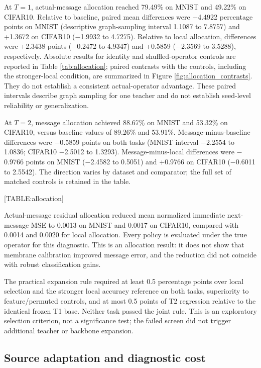 \documentclass{article}
\begin{document}
At $T=1$, actual-message allocation reached 79.49\% on MNIST and 49.22\% on CIFAR10. Relative to baseline, paired mean differences were +4.4922 percentage points on MNIST (descriptive graph-sampling interval 1.1087 to 7.8757) and +1.3672 on CIFAR10 ($-$1.9932 to 4.7275). Relative to local allocation, differences were +2.3438 points ($-$0.2472 to 4.9347) and +0.5859 ($-$2.3569 to 3.5288), respectively. Absolute results for identity and shuffled-operator controls are reported in Table \ref{tab:allocation}; paired contrasts with the controls, including the stronger-local condition, are summarized in Figure \ref{fig:allocation_contrasts}. They do not establish a consistent actual-operator advantage. These paired intervals describe graph sampling for one teacher and do not establish seed-level reliability or generalization.

At $T=2$, message allocation achieved 88.67\% on MNIST and 53.32\% on CIFAR10, versus baseline values of 89.26\% and 53.91\%. Message-minus-baseline differences were $-$0.5859 points on both tasks (MNIST interval $-$2.2554 to 1.0836; CIFAR10 $-$2.5012 to 1.3293). Message-minus-local differences were $-$0.9766 points on MNIST ($-$2.4582 to 0.5051) and +0.9766 on CIFAR10 ($-$0.6011 to 2.5542). The direction varies by dataset and comparator; the full set of matched controls is retained in the table.

[TABLE:allocation]

Actual-message residual allocation reduced mean normalized immediate next-message MSE to 0.0013 on MNIST and 0.0017 on CIFAR10, compared with 0.0014 and 0.0020 for local allocation. Every policy is evaluated under the true operator for this diagnostic. This is an allocation result: it does not show that membrane calibration improved message error, and the reduction did not coincide with robust classification gains.

The practical expansion rule required at least 0.5 percentage points over local selection and the stronger local accuracy reference on both tasks, superiority to feature/permuted controls, and at most 0.5 points of T2 regression relative to the identical frozen T1 base. Neither task passed the joint rule. This is an exploratory selection criterion, not a significance test; the failed screen did not trigger additional teacher or backbone expansion.

\subsection{Source adaptation and diagnostic cost}
\end{document}
